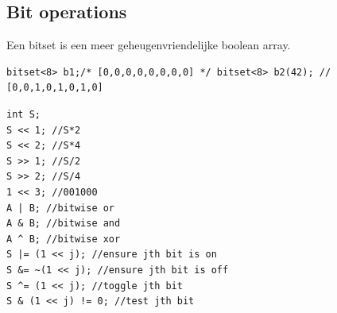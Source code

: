 \documentclass[10pt,a4paper,titlepage]{article}
\begin{document}
\subsection{Bit operations}
Een bitset is een meer geheugenvriendelijke boolean array.
\begin{lstlisting}
bitset<8> b1;/* [0,0,0,0,0,0,0,0] */ bitset<8> b2(42); // [0,0,1,0,1,0,1,0] 
\end{lstlisting}

\begin{multicols}{2}
\begin{lstlisting}
int S;
S << 1; //S*2
S << 2; //S*4
S >> 1; //S/2
S >> 2; //S/4
1 << 3; //001000
A | B; //bitwise or
A & B; //bitwise and
A ^ B; //bitwise xor
S |= (1 << j); //ensure jth bit is on
S &= ~(1 << j); //ensure jth bit is off
S ^= (1 << j); //toggle jth bit
S & (1 << j) != 0; //test jth bit
\end{lstlisting}
\end{multicols}
\end{document}
